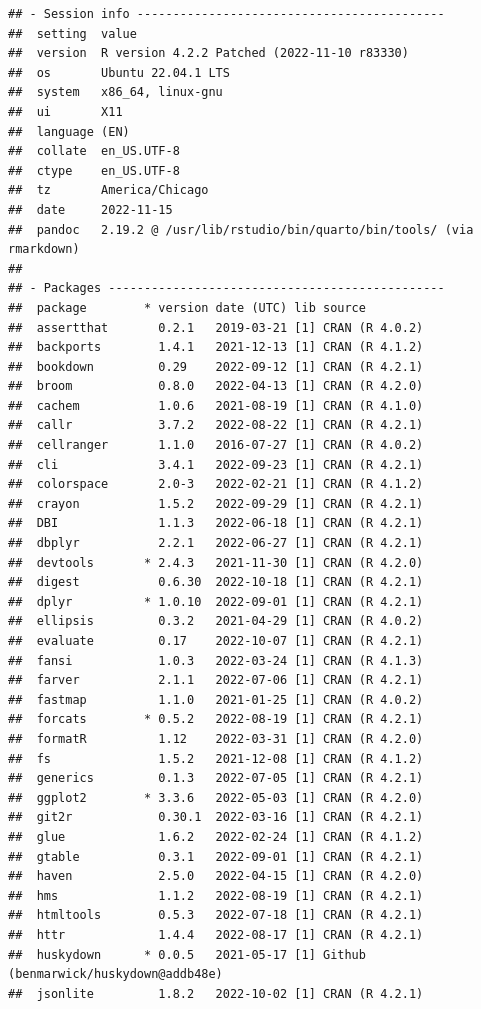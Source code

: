 \documentclass[print]{nuthesis}
\begin{document}
\begin{verbatim}
## - Session info -------------------------------------------
##  setting  value
##  version  R version 4.2.2 Patched (2022-11-10 r83330)
##  os       Ubuntu 22.04.1 LTS
##  system   x86_64, linux-gnu
##  ui       X11
##  language (EN)
##  collate  en_US.UTF-8
##  ctype    en_US.UTF-8
##  tz       America/Chicago
##  date     2022-11-15
##  pandoc   2.19.2 @ /usr/lib/rstudio/bin/quarto/bin/tools/ (via rmarkdown)
## 
## - Packages -----------------------------------------------
##  package        * version date (UTC) lib source
##  assertthat       0.2.1   2019-03-21 [1] CRAN (R 4.0.2)
##  backports        1.4.1   2021-12-13 [1] CRAN (R 4.1.2)
##  bookdown         0.29    2022-09-12 [1] CRAN (R 4.2.1)
##  broom            0.8.0   2022-04-13 [1] CRAN (R 4.2.0)
##  cachem           1.0.6   2021-08-19 [1] CRAN (R 4.1.0)
##  callr            3.7.2   2022-08-22 [1] CRAN (R 4.2.1)
##  cellranger       1.1.0   2016-07-27 [1] CRAN (R 4.0.2)
##  cli              3.4.1   2022-09-23 [1] CRAN (R 4.2.1)
##  colorspace       2.0-3   2022-02-21 [1] CRAN (R 4.1.2)
##  crayon           1.5.2   2022-09-29 [1] CRAN (R 4.2.1)
##  DBI              1.1.3   2022-06-18 [1] CRAN (R 4.2.1)
##  dbplyr           2.2.1   2022-06-27 [1] CRAN (R 4.2.1)
##  devtools       * 2.4.3   2021-11-30 [1] CRAN (R 4.2.0)
##  digest           0.6.30  2022-10-18 [1] CRAN (R 4.2.1)
##  dplyr          * 1.0.10  2022-09-01 [1] CRAN (R 4.2.1)
##  ellipsis         0.3.2   2021-04-29 [1] CRAN (R 4.0.2)
##  evaluate         0.17    2022-10-07 [1] CRAN (R 4.2.1)
##  fansi            1.0.3   2022-03-24 [1] CRAN (R 4.1.3)
##  farver           2.1.1   2022-07-06 [1] CRAN (R 4.2.1)
##  fastmap          1.1.0   2021-01-25 [1] CRAN (R 4.0.2)
##  forcats        * 0.5.2   2022-08-19 [1] CRAN (R 4.2.1)
##  formatR          1.12    2022-03-31 [1] CRAN (R 4.2.0)
##  fs               1.5.2   2021-12-08 [1] CRAN (R 4.1.2)
##  generics         0.1.3   2022-07-05 [1] CRAN (R 4.2.1)
##  ggplot2        * 3.3.6   2022-05-03 [1] CRAN (R 4.2.0)
##  git2r            0.30.1  2022-03-16 [1] CRAN (R 4.2.1)
##  glue             1.6.2   2022-02-24 [1] CRAN (R 4.1.2)
##  gtable           0.3.1   2022-09-01 [1] CRAN (R 4.2.1)
##  haven            2.5.0   2022-04-15 [1] CRAN (R 4.2.0)
##  hms              1.1.2   2022-08-19 [1] CRAN (R 4.2.1)
##  htmltools        0.5.3   2022-07-18 [1] CRAN (R 4.2.1)
##  httr             1.4.4   2022-08-17 [1] CRAN (R 4.2.1)
##  huskydown      * 0.0.5   2021-05-17 [1] Github (benmarwick/huskydown@addb48e)
##  jsonlite         1.8.2   2022-10-02 [1] CRAN (R 4.2.1)

\end{verbatim}
\end{document}

